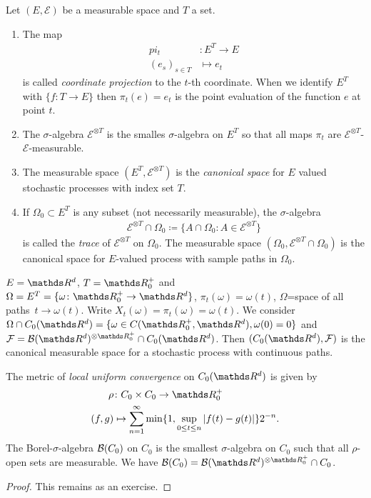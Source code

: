\begin{defi}
Let $(E,\mathcal{E})$ be a measurable space and $T$ a set.
\begin{enumerate}[label=\roman*)]
\item The map 
\begin{align*}
pi_t&\colon E^T\to E\\
(e_s)_{s\in T} &\mapsto e_t
\end{align*}
is called \emph{coordinate projection} to the $t$-th coordinate.
When we identify $E^T$ with $\{f \colon T \to E\}$ then $\pi_t(e)=e_t$ is the point evaluation of the function $e$ at point $t$.
\item The $\sigma$-algebra $\mathcal{E}^{\otimes T}$ is the smalles $\sigma$-algebra on $E^T$ so that all maps $\pi_t$ are $\mathcal{E}^{\otimes T}$-$\mathcal{E}$-measurable.
\item The measurable space $(E^T,\mathcal{E}^{\otimes T})$ is the \emph{canonical space} for $E$ valued stochastic processes with index set $T$.
\item If $\Omega_0\subset E^T$ is any subset (not necessarily measurable), the $\sigma$-algebra
\begin{align*}
\mathcal{E}^{\otimes T}\cap \Omega_0 \coloneqq \{A \cap \Omega_0 \colon A \in \mathcal{E}^{\otimes T}\}
\end{align*}
is called the \emph{trace} of $\mathcal{E}^{\otimes T}$ on $\Omega_0$.
The measurable space $(\Omega_0,\mathcal{E}^{\otimes T}\cap \Omega_0)$
is the canonical space for $E$-valued process with sample paths in $\Omega_0$.
\end{enumerate}
\end{defi}

\begin{bsp}
$E=\Rd$, $T=\R_0^+$ and $\Omega=E^T=\{\omega \colon \R_0^+ \to \Rd\}$,
$\pi_t(\omega)=\omega(t)$, $\Omega$=space of all \glqq paths\grqq\, $t \to \omega(t)$.
Write $X_t(\omega)=\pi_t(\omega)=\omega(t)$.
We consider $\Omega \cap C_0(\Rd)=\{\omega \in C(\R_0^+,\Rd), \omega(0)=0\}$ and $\mathcal{F}=\Borel(\Rd)^{\otimes \R_0^+} \cap C_0(\Rd)$.
Then $(C_0(\Rd),\mathcal{F})$ is the canonical measurable space for a stochastic process with continuous paths.
\end{bsp}

\begin{bem}
The metric of \emph{local uniform convergence} on $C_0(\Rd)$ is given by 
\begin{align*}
\rho &\colon C_0\times C_0 \to \R_0^+\\
(f,g) &\mapsto \sum_{n=1}^\infty \min\{1,\sup_{0\leq t \leq n}\abs{f(t)-g(t)}\} 2^{-n}. 
\end{align*}
The Borel-$\sigma$-algebra $\mathcal{B}(C_0)$ on $C_0$ is the smallest $\sigma$-algebra on $C_0$ such that all $\rho$-open sets are measurable.
We have $\Borel(C_0)=\Borel(\Rd)^{\otimes \R_0^+}\cap C_0$.
\begin{proof}
This remains as an exercise.
\end{proof}
\end{bem}

